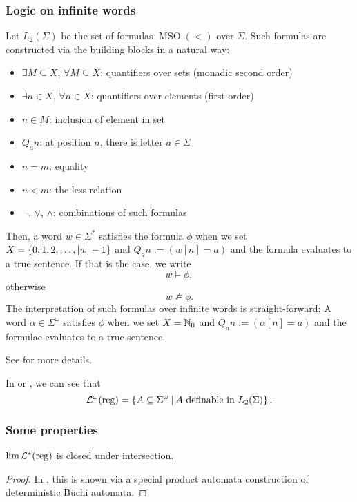 \subsubsection{Logic on infinite words}
Let $L_2(\Sigma)$ be the set of formulas $\operatorname{MSO}(<)$ over $\Sigma$. Such formulas are constructed via the building blocks in a natural way:
\begin{itemize}
\item $\exists M \subseteq X$, $\forall M \subseteq X$: quantifiers over sets (monadic second order)
\item $\exists n \in X$, $\forall n \in X$: quantifiers over elements (first order)
\item $n \in M$: inclusion of element in set
\item $Q_a n$: at position $n$, there is letter $a \in \Sigma$
\item $n = m$: equality
\item $n < m$: the less relation
\item $\neg$, $\vee$, $\wedge$: combinations of such formulas
\end{itemize}
Then, a word $w \in \Sigma^*$ satisfies the formula $\phi$ when we set $X = \Set{0,1,2,\dots,\left|w\right|-1}$ and $Q_a n := (w[n] = a)$ and the formula evaluates to a true sentence. If that is the case, we write
\[ w \models \phi , \]
otherwise
\[ w \not\models \phi . \]
The interpretation of such formulas over infinite words is straight-forward: A word $\alpha \in \Sigma^\omega$ satisfies $\phi$ when we set $X = \mathbb{N}_0$ and $Q_a n := (\alpha[n] = a)$ and the formulae evaluates to a true sentence.

See \cite{FinAutLogR109} for more details.

In \cite[Theorem 3.1]{CombR107} or \cite{FinAutLogR109}, we can see that
\[ \LangOreg = \Set{A \subseteq \Sigma^\omega}{A \text{ definable in } L_2(\Sigma)} . \]

\subsubsection{Some properties}

\begin{lemma}
\label{reg:limRegClosedIntersection}
$\lim \mathcal{L}^*(\textup{\textrm{reg}})$ is closed under intersection.
\begin{proof}
In \cite[Chapter 12, Remark 12.4]{CAVR112}, this is shown via a special product automata construction of deterministic Büchi automata.
\end{proof}
\end{lemma}
